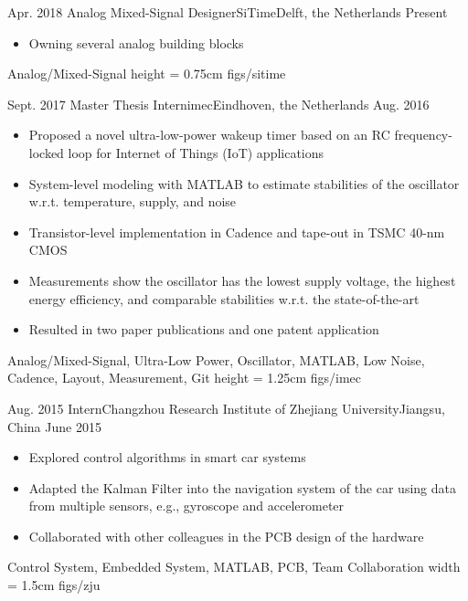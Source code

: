 %
%
%
%
%

\begin{experiences}
	\experience
	{Apr. 2018}	{Analog Mixed-Signal Designer}{SiTime}{Delft, the Netherlands}
	{Present}	{
					\begin{itemize}
						\item Owning several analog building blocks
					\end{itemize}
				}
				{Analog/Mixed-Signal}
	 {height = 0.75cm}		{figs/sitime}
	\emptySeparator

	\experience
    {Sept. 2017}	{Master Thesis Intern}{imec}{Eindhoven, the Netherlands}
    {Aug. 2016}	{
    				\begin{itemize}
    					\item Proposed a novel ultra-low-power wakeup timer based on an RC frequency-locked loop for Internet of Things (IoT) applications
              \item System-level modeling with MATLAB to estimate stabilities of the oscillator w.r.t. temperature, supply, and noise
              \item Transistor-level implementation in Cadence and tape-out in TSMC 40-nm CMOS
              \item Measurements show the oscillator has the lowest supply voltage, the highest energy efficiency, and comparable stabilities w.r.t. the state-of-the-art
							\item Resulted in two paper publications and one patent application
    				\end{itemize}
    			}
                {Analog/Mixed-Signal, Ultra-Low Power, Oscillator, MATLAB, Low Noise, Cadence, Layout, Measurement, Git}
     {height = 1.25cm}		{figs/imec}
	\emptySeparator

    \experience
    {Aug. 2015}	{Intern}{Changzhou Research Institute of Zhejiang University}{Jiangsu, China}
    {June 2015}{
    				\begin{itemize}
              \item Explored control algorithms in smart car systems
    					\item Adapted the Kalman Filter into the navigation system of the car using data from multiple sensors, e.g., gyroscope and accelerometer
              \item Collaborated with other colleagues in the PCB design of the hardware
    				\end{itemize}
    			}
                {Control System, Embedded System, MATLAB, PCB, Team Collaboration}
     {width = 1.5cm}		{figs/zju}

\end{experiences}
